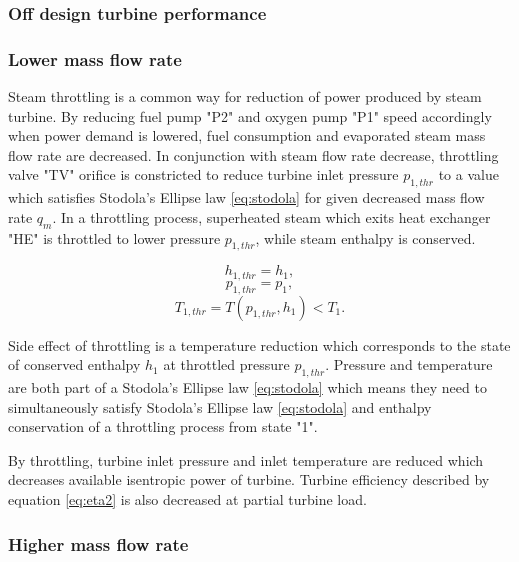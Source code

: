 \documentclass{article}
\begin{document}
	\subsubsection*{Off design turbine performance}
	
	\subsubsection*{Lower mass flow rate}
	
	Steam throttling is a common way for reduction of power produced by steam 
	turbine. By reducing fuel pump "P2" and oxygen pump "P1" speed accordingly 
	when power demand is lowered, fuel consumption and evaporated steam mass 
	flow rate are decreased. In conjunction with steam flow rate decrease, 
	throttling valve "TV" orifice is constricted to reduce turbine inlet 
	pressure $p_{1,thr}$ to a value which satisfies Stodola’s Ellipse law 
	\ref{eq:stodola} for given decreased mass flow rate $q_m$. In a throttling 
	process, superheated steam which exits heat exchanger "HE" is throttled to 
	lower pressure $p_{1,thr}$, while steam enthalpy is conserved.
	
	\begin{equation}\label{eq:ent_preserve1}
		h_{1,thr} = h_1,
	\end{equation}
	\begin{equation}\label{eq:ent_preserve2}
	p_{1,thr} = p_1,
	\end{equation}
	\begin{equation}\label{eq:ent_preserve3}
	T_{1,thr} = T(p_{1,thr},h_1) < T_1.
	\end{equation}
	
	Side effect of throttling is a temperature reduction which corresponds to the state of conserved enthalpy $h_1$ at throttled pressure $p_{1,thr}$. Pressure and temperature are both part of a Stodola’s Ellipse law \ref{eq:stodola} which means they need to simultaneously satisfy Stodola’s Ellipse law  \ref{eq:stodola}  and enthalpy conservation of a throttling process from state "1".
	
	By throttling, turbine inlet pressure and inlet temperature are reduced which decreases available isentropic power of turbine. Turbine efficiency described by equation \ref{eq:eta2} is also decreased at partial turbine load.
	
	\subsubsection*{Higher mass flow rate}
	
\end{document}

